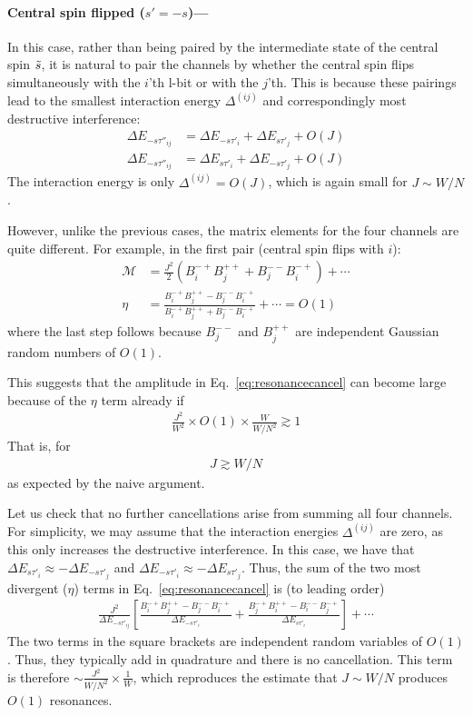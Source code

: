 \documentclass[aps,pra,twocolumn,a4paper,showpacs,superscriptaddress,floatfix,10pt]{revtex4}
\begin{document}
\begin{widetext}
\paragraph{Central spin flipped ($s'=-s$)---}
In this case, rather than being paired by the intermediate state of the central spin $\tilde{s}$, it is natural to pair the channels by whether the central spin flips simultaneously with the $i$'th l-bit or with the $j$'th.
This is because these pairings lead to the smallest interaction energy $\Delta^{(ij)}$ and correspondingly most destructive interference:
\begin{align}
	\Delta E_{-s \tau''_{ij}} &= \Delta E_{-s \tau'_i} + \Delta E_{s \tau'_j} + O(J) \\
	\Delta E_{-s \tau''_{ij}} &= \Delta E_{s \tau'_i} + \Delta E_{-s \tau'_j} + O(J)
\end{align}
The interaction energy is only $\Delta^{(ij)} = O(J)$, which is again small for $J \sim W/N$.

However, unlike the previous cases, the matrix elements for the four channels are quite different. For example, in the first pair (central spin flips with $i$):
\begin{align}
	\mathcal{M} &= \frac{J^2}{2} \left(B_i^{-+}B_j^{++} + B_j^{--}B_i^{-+}\right) + \cdots \\
	\eta &= \frac{B_i^{-+}B_j^{++} - B_j^{--}B_i^{-+}}{B_i^{-+}B_j^{++} + B_j^{--}B_i^{-+}} + \cdots = O(1)
\end{align}
where the last step follows because $B_j^{--}$ and $B_j^{++}$ are independent Gaussian random numbers of $O(1)$.

This suggests that the amplitude in Eq.~\eqref{eq:resonancecancel} can become large because of the $\eta$ term already if
\begin{align}
	\frac{J^2}{W^2} \times O(1) \times \frac{W}{W/N^2} \gtrsim 1
\end{align}
That is, for
\begin{align}
	J \gtrsim W/N
\end{align}
as expected by the naive argument.

Let us check that no further cancellations arise from summing all four channels.
For simplicity, we may assume that the interaction energies $\Delta^{(ij)}$ are zero, as this only increases the destructive interference. In this case, we have that $\Delta E_{s \tau'_i} \approx -\Delta E_{-s \tau'_j}$ and $\Delta E_{-s \tau'_i} \approx -\Delta E_{s \tau'_j}$. Thus, the sum of the two most divergent ($\eta$) terms in Eq.~\eqref{eq:resonancecancel} is (to leading order)
\begin{align}
	 \frac{J^2}{\Delta E_{-s \tau'_{ij}}} \left[ \frac{B_i^{-+}B_j^{++}-B_j^{--}B_i^{-+}}{\Delta E_{-s \tau'_i}} +
	\frac{B_j^{-+}B_i^{++}-B_i^{--}B_j^{-+}}{\Delta E_{s \tau'_i}} \right] + \cdots
\end{align}
The two terms in the square brackets are independent random variables of $O(1)$. Thus, they typically add in quadrature and there is no cancellation.
This term is therefore $\sim \frac{J^2}{W/N^2} \times \frac{1}{W}$, which reproduces the estimate that $J \sim W/N$ produces $O(1)$ resonances.


\end{widetext}
\end{document}
